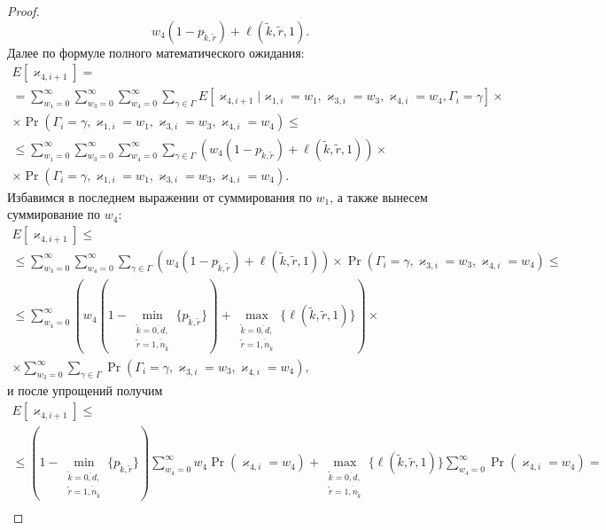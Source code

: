 \begin{proof}
\begin{equation*}
     w_4 (1-p_{\tilde{k}, \tilde{r}}) + \ell(\tilde{k}, \tilde{r}, 1).
\end{equation*}
Далее по формуле полного математического ожидания:
\begin{multline*}
    E[\varkappa_{4, i+1}] =  \\
    =\sum_{w_1=0}^{\infty} \sum_{w_3=0}^{\infty}  \sum_{w_4=0}^{\infty} \sum_{\gamma \in \Gamma}  E[\varkappa_{4, i+1} | \varkappa_{1, i}=w_1, \varkappa_{3, i}=w_3,  \varkappa_{4, i}=w_4,  \Gamma_i=\gamma]  \times \\ 
    \times
    \Pr(\Gamma_{i}=\gamma,  \varkappa_{1, i}=w_1,  \varkappa_{3, i}=w_3,  \varkappa_{4, i}=w_4)
    \leqslant \\ 
    \leqslant
    \sum_{w_1=0}^{\infty} \sum_{w_3=0}^{\infty}  \sum_{w_4=0}^{\infty} \sum_{\gamma \in \Gamma} 
    ( w_4 (1-p_{\tilde{k}, \tilde{r}}) + \ell(\tilde{k}, \tilde{r}, 1) )     \times \\
    \times
    \Pr(\Gamma_{i}=\gamma,  \varkappa_{1, i}=w_1,  \varkappa_{3, i}=w_3,  \varkappa_{4, i}=w_4).
\end{multline*}
Избавимся в последнем выражении от суммирования по $w_1$,  а также вынесем суммирование по $w_4$:
    \begin{multline*}
    E[\varkappa_{4, i+1}]\leqslant\\
    \leqslant
    \sum_{w_3=0}^{\infty}  \sum_{w_4=0}^{\infty} \sum_{\gamma \in \Gamma} 
    ( w_4 (1-p_{\tilde{k}, \tilde{r}}) + \ell(\tilde{k}, \tilde{r}, 1) ) \times 
    \Pr(\Gamma_{i}=\gamma,  \varkappa_{3, i}=w_3,  \varkappa_{4, i}=w_4)  \leqslant\\
    \leqslant
    \sum_{w_4=0}^{\infty}  ( w_4 (1-\min_{\substack{\tilde{k}=\overline{0, d}, \\ \tilde{r}=\overline{1, n_{\tilde{k}}}}}{\{p_{\tilde{k}, \tilde{r}}\}}) + \max_{\substack{\tilde{k}=\overline{0, d}, \\ \tilde{r}=\overline{1, n_{\tilde{k}}}} } {\{\ell(\tilde{k}, \tilde{r}, 1)\}} )    \times \\
   \times \sum_{w_3=0}^{\infty}   \sum_{\gamma \in \Gamma} 
 \Pr(\Gamma_{i}=\gamma,  \varkappa_{3, i}=w_3,  \varkappa_{4, i}=w_4),
\end{multline*}
и после упрощений получим
\begin{multline*}
        E[\varkappa_{4, i+1}]\leqslant\\
    \leqslant
         (1-\min_{\substack{\tilde{k}=\overline{0, d}, \\ \tilde{r}=\overline{1, n_{\tilde{k}}}}}{\{p_{\tilde{k}, \tilde{r}}\}}) \sum_{w_4=0}^{\infty}   w_4 \Pr(\varkappa_{4, i}=w_4) + \max_{\substack{\tilde{k}=\overline{0, d}, \\ \tilde{r}=\overline{1, n_{\tilde{k}}}}}{\{\ell(\tilde{k}, \tilde{r}, 1)\}}    \sum_{w_4=0}^{\infty}\Pr(\varkappa_{4, i}=w_4) = \\

\end{multline*}
\end{proof}
